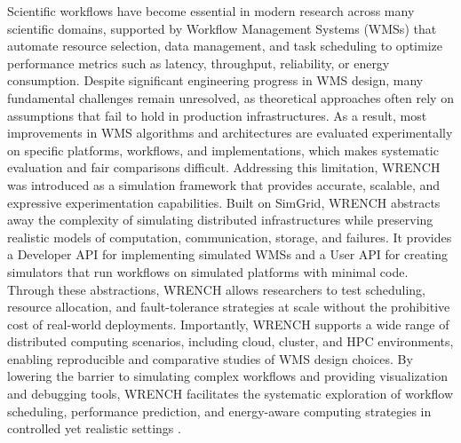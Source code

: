 Scientific workflows have become essential in modern research across many scientific domains, supported by Workflow Management Systems (WMSs) that automate resource selection, data management, and task scheduling to optimize performance metrics such as latency, throughput, reliability, or energy consumption. Despite significant engineering progress in WMS design, many fundamental challenges remain unresolved, as theoretical approaches often rely on assumptions that fail to hold in production infrastructures. As a result, most improvements in WMS algorithms and architectures are evaluated experimentally on specific platforms, workflows, and implementations, which makes systematic evaluation and fair comparisons difficult. Addressing this limitation, WRENCH was introduced as a simulation framework that provides accurate, scalable, and expressive experimentation capabilities. Built on SimGrid, WRENCH abstracts away the complexity of simulating distributed infrastructures while preserving realistic models of computation, communication, storage, and failures. It provides a Developer API for implementing simulated WMSs and a User API for creating simulators that run workflows on simulated platforms with minimal code. Through these abstractions, WRENCH allows researchers to test scheduling, resource allocation, and fault-tolerance strategies at scale without the prohibitive cost of real-world deployments. Importantly, WRENCH supports a wide range of distributed computing scenarios, including cloud, cluster, and HPC environments, enabling reproducible and comparative studies of WMS design choices. By lowering the barrier to simulating complex workflows and providing visualization and debugging tools, WRENCH facilitates the systematic exploration of workflow scheduling, performance prediction, and energy-aware computing strategies in controlled yet realistic settings \cite{wrench}.





